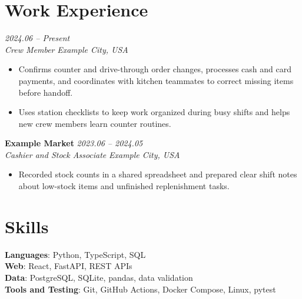 \documentclass[11pt, letterpaper]{extarticle}
\newcommand{\resumeItem}[1]{\item\small{#1\vspace{-2pt}}}
\newcommand{\resumeSubheading}[4]{\vspace{6pt}\textbf{#1} \hfill \textit{#2}\\
\textit{#3} \hfill \textit{#4}\vspace{1pt}}
\newcommand{\resumeSubheadingLarge}[4]{\vspace{6pt}{\large\textbf{#1}} \hfill \textit{#2}\\
\textit{#3} \hfill \textit{#4}\vspace{1pt}}
\newcommand{\resumeItemListStart}{\begin{itemize}[leftmargin=0.18in, itemsep=2pt, topsep=0pt]}
\newcommand{\resumeItemListEnd}{\end{itemize}\vspace{-3pt}}
\begin{document}
\section{Work Experience}
\resumeSubheadingLarge{McDonald's}{2024.06 -- Present}{Crew Member}{Example City, USA}
\resumeItemListStart
  \resumeItem{Confirms counter and drive-through order changes, processes cash and card payments, and coordinates with kitchen teammates to correct missing items before handoff.}
  \resumeItem{Uses station checklists to keep work organized during busy shifts and helps new crew members learn counter routines.}
\resumeItemListEnd

\resumeSubheading{Example Market}{2023.06 -- 2024.05}{Cashier and Stock Associate}{Example City, USA}
\resumeItemListStart
  \resumeItem{Recorded stock counts in a shared spreadsheet and prepared clear shift notes about low-stock items and unfinished replenishment tasks.}
\resumeItemListEnd

\section{Skills}
\vspace{8pt}
\begin{itemize}[leftmargin=0.1in, label={}]
  \small{\item{
    \textbf{Languages}: Python, TypeScript, SQL \\
    \textbf{Web}: React, FastAPI, REST APIs \\
    \textbf{Data}: PostgreSQL, SQLite, pandas, data validation \\
    \textbf{Tools and Testing}: Git, GitHub Actions, Docker Compose, Linux, pytest
  }}
\end{itemize}
\end{document}
